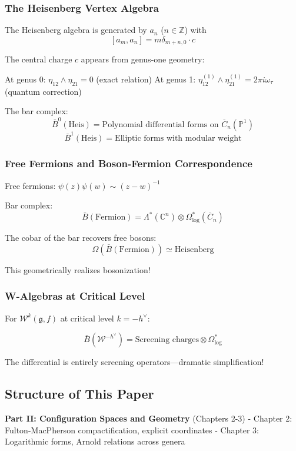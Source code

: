 \subsubsection{The Heisenberg Vertex Algebra}

The Heisenberg algebra is generated by $a_n$ ($n \in \mathbb{Z}$) with
$$[a_m, a_n] = m\delta_{m+n,0} \cdot c$$

The central charge $c$ appears from genus-one geometry:

At genus 0: $\eta_{12} \wedge \eta_{21} = 0$ (exact relation)
At genus 1: $\eta_{12}^{(1)} \wedge \eta_{21}^{(1)} = 2\pi i \omega_\tau$ (quantum correction)

The bar complex:
$$\bar{B}^0(\text{Heis}) = \text{Polynomial differential forms on } \overline{C}_n(\mathbb{P}^1)$$
$$\bar{B}^1(\text{Heis}) = \text{Elliptic forms with modular weight}$$

\subsubsection{Free Fermions and Boson-Fermion Correspondence}

Free fermions: $\psi(z)\psi(w) \sim (z-w)^{-1}$

Bar complex:
$$\bar{B}(\text{Fermion}) = \Lambda^*(\mathbb{C}^n) \otimes \Omega^*_{\text{log}}(\overline{C}_n)$$

The cobar of the bar recovers free bosons:
$$\Omega(\bar{B}(\text{Fermion})) \simeq \text{Heisenberg}$$

This geometrically realizes bosonization!

\subsubsection{W-Algebras at Critical Level}

For $\mathcal{W}^k(\mathfrak{g}, f)$ at critical level $k = -h^\vee$:

$$\bar{B}(\mathcal{W}^{-h^\vee}) = \text{Screening charges} \otimes \Omega^*_{\text{log}}$$

The differential is entirely screening operators—dramatic simplification!

\subsection{Structure of This Paper}

\textbf{Part II: Configuration Spaces and Geometry} (Chapters 2-3)
- Chapter 2: Fulton-MacPherson compactification, explicit coordinates
- Chapter 3: Logarithmic forms, Arnold relations across genera

